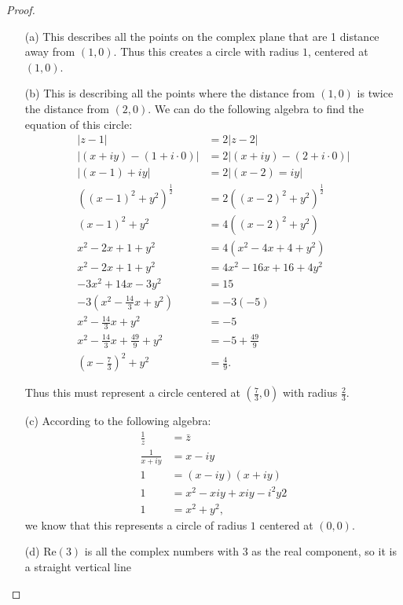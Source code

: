 \documentclass[12pt]{article}
\begin{document}
\begin{proof}
  \begin{itemize}
    \item[(a)] This describes all the points on the complex plane that are 1 distance away from $(1,0)$. Thus this creates 
      a circle with radius $1$, centered at $(1,0)$.
    \item[(b)] This is describing all the points where the distance from $(1,0)$ is twice the distance from $(2,0)$. We can do the
      following algebra to find the equation of this circle:
      \begin{align*}
        | z - 1 | &= 2 |z - 2| \\
        |(x+iy)-(1+i \cdot 0)| &= 2 | (x+iy) - (2 + i \cdot 0)| \\
        |(x-1)+iy| &= 2|(x-2) =iy| \\
        ((x-1)^2+y^2)^{\frac{1}{2}} &= 2((x-2)^2+y^2)^{\frac{1}{2}} \\ 
        (x-1)^2+y^2 &= 4((x-2)^2+y^2) \\
        x^2 -2x +1+y^2 &= 4(x^2 -4x+4+y^2) \\
        x^2-2x+1+y^2 &= 4x^2-16x+16+4y^2 \\
        -3x^2 +14x -3y^2 &= 15 \\
        -3 \left( x^2 - \frac{14}{3} x +y^2 \right) &= -3(-5) \\
        x^2 - \frac{14}{3} x +y^2 &= -5 \\
        x^2 - \frac{14}{3}x + \frac{49}{9} + y^2 &= -5 + \frac{49}{9} \\
        \left( x- \frac{7}{3} \right)^2 + y^2 &= \frac{4}{9}.
      \end{align*}
      \par Thus this must represent a circle centered at $(\frac{7}{3},0)$ with radius $\frac{2}{3}$. 
    \item[(c)] According to the following algebra:
      \begin{align*}
        \frac{1}{z} &= \bar{z} \\
        \frac{1}{x+iy} &= x - iy \\
        1 &= (x-iy)(x+iy) \\
        1 &= x^2 -xiy +xiy -i^2y2 \\
        1 &= x^2 + y^2,
      \end{align*}
      we know that this represents a circle of radius $1$ centered at $(0,0)$.
    \item[(d)] $\text{Re}(3)$ is all the complex numbers with $3$ as the real component, so it is a straight vertical line 

\end{itemize}
\end{proof}
\end{document}

